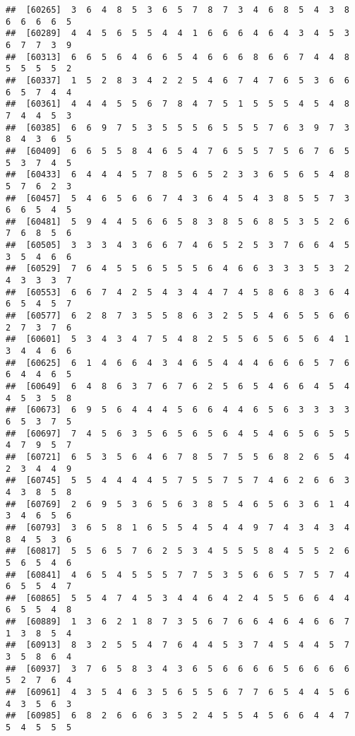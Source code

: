 \documentclass[
]{book}
\begin{document}
\begin{verbatim}
##  [60265]  3  6  4  8  5  3  6  5  7  8  7  3  4  6  8  5  4  3  8  6  6  6  6  5
##  [60289]  4  4  5  6  5  5  4  4  1  6  6  6  4  6  4  3  4  5  3  6  7  7  3  9
##  [60313]  6  6  5  6  4  6  6  5  4  6  6  6  8  6  6  7  4  4  8  5  5  5  5  2
##  [60337]  1  5  2  8  3  4  2  2  5  4  6  7  4  7  6  5  3  6  6  6  5  7  4  4
##  [60361]  4  4  4  5  5  6  7  8  4  7  5  1  5  5  5  4  5  4  8  7  4  4  5  3
##  [60385]  6  6  9  7  5  3  5  5  5  6  5  5  5  7  6  3  9  7  3  8  4  3  6  5
##  [60409]  6  6  5  5  8  4  6  5  4  7  6  5  5  7  5  6  7  6  5  5  3  7  4  5
##  [60433]  6  4  4  4  5  7  8  5  6  5  2  3  3  6  5  6  5  4  8  5  7  6  2  3
##  [60457]  5  4  6  5  6  6  7  4  3  6  4  5  4  3  8  5  5  7  3  6  6  5  4  5
##  [60481]  5  9  4  4  5  6  6  5  8  3  8  5  6  8  5  3  5  2  6  7  6  8  5  6
##  [60505]  3  3  3  4  3  6  6  7  4  6  5  2  5  3  7  6  6  4  5  3  5  4  6  6
##  [60529]  7  6  4  5  5  6  5  5  5  6  4  6  6  3  3  3  5  3  2  4  3  3  3  7
##  [60553]  6  6  7  4  2  5  4  3  4  4  7  4  5  8  6  8  3  6  4  6  5  4  5  7
##  [60577]  6  2  8  7  3  5  5  8  6  3  2  5  5  4  6  5  5  6  6  2  7  3  7  6
##  [60601]  5  3  4  3  4  7  5  4  8  2  5  5  6  5  6  5  6  4  1  3  4  4  6  6
##  [60625]  6  1  4  6  6  4  3  4  6  5  4  4  4  6  6  6  5  7  6  6  4  4  6  5
##  [60649]  6  4  8  6  3  7  6  7  6  2  5  6  5  4  6  6  4  5  4  4  5  3  5  8
##  [60673]  6  9  5  6  4  4  4  5  6  6  4  4  6  5  6  3  3  3  3  6  5  3  7  5
##  [60697]  7  4  5  6  3  5  6  5  6  5  6  4  5  4  6  5  6  5  5  4  7  9  5  7
##  [60721]  6  5  3  5  6  4  6  7  8  5  7  5  5  6  8  2  6  5  4  2  3  4  4  9
##  [60745]  5  5  4  4  4  4  5  7  5  5  7  5  7  4  6  2  6  6  3  4  3  8  5  8
##  [60769]  2  6  9  5  3  6  5  6  3  8  5  4  6  5  6  3  6  1  4  3  4  6  5  6
##  [60793]  3  6  5  8  1  6  5  5  4  5  4  4  9  7  4  3  4  3  4  8  4  5  3  6
##  [60817]  5  5  6  5  7  6  2  5  3  4  5  5  5  8  4  5  5  2  6  5  6  5  4  6
##  [60841]  4  6  5  4  5  5  5  7  7  5  3  5  6  6  5  7  5  7  4  6  5  5  4  7
##  [60865]  5  5  4  7  4  5  3  4  4  6  4  2  4  5  5  6  6  4  4  6  5  5  4  8
##  [60889]  1  3  6  2  1  8  7  3  5  6  7  6  6  4  6  4  6  6  7  1  3  8  5  4
##  [60913]  8  3  2  5  5  4  7  6  4  4  5  3  7  4  5  4  4  5  7  3  5  8  6  4
##  [60937]  3  7  6  5  8  3  4  3  6  5  6  6  6  6  5  6  6  6  6  5  2  7  6  4
##  [60961]  4  3  5  4  6  3  5  6  5  5  6  7  7  6  5  4  4  5  6  4  3  5  6  3
##  [60985]  6  8  2  6  6  6  3  5  2  4  5  5  4  5  6  6  4  4  7  5  4  5  5  5

\end{verbatim}
\end{document}
